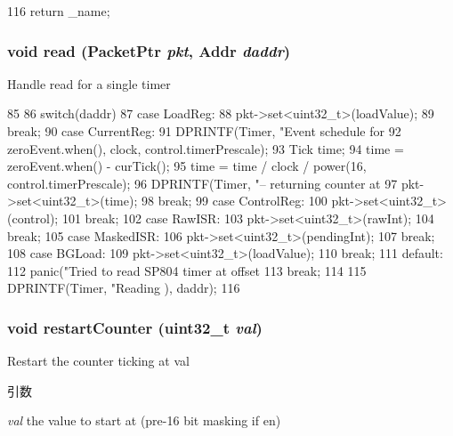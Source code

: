 \begin{DoxyCode}
116 { return _name; }
\end{DoxyCode}
\hypertarget{classSp804_1_1Timer_a6ecbcc960e1c0cd0a0f4c64e7ae58d14}{
\subsubsection[{read}]{\setlength{\rightskip}{0pt plus 5cm}void read ({\bf PacketPtr} {\em pkt}, \/  {\bf Addr} {\em daddr})}}
\label{classSp804_1_1Timer_a6ecbcc960e1c0cd0a0f4c64e7ae58d14}
Handle read for a single timer 


\begin{DoxyCode}
85 {
86     switch(daddr) {
87       case LoadReg:
88         pkt->set<uint32_t>(loadValue);
89         break;
90       case CurrentReg:
91         DPRINTF(Timer, "Event schedule for %
92                 zeroEvent.when(), clock, control.timerPrescale);
93         Tick time;
94         time = zeroEvent.when() - curTick();
95         time = time / clock / power(16, control.timerPrescale);
96         DPRINTF(Timer, "-- returning counter at %
97         pkt->set<uint32_t>(time);
98         break;
99       case ControlReg:
100         pkt->set<uint32_t>(control);
101         break;
102       case RawISR:
103         pkt->set<uint32_t>(rawInt);
104         break;
105       case MaskedISR:
106         pkt->set<uint32_t>(pendingInt);
107         break;
108       case BGLoad:
109         pkt->set<uint32_t>(loadValue);
110         break;
111       default:
112         panic("Tried to read SP804 timer at offset %
113         break;
114     }
115     DPRINTF(Timer, "Reading %
      ), daddr);
116 }
\end{DoxyCode}
\hypertarget{classSp804_1_1Timer_a5e2d72e72192a57c6d3f61a22d1790cc}{
\subsubsection[{restartCounter}]{\setlength{\rightskip}{0pt plus 5cm}void restartCounter ({\bf uint32\_\-t} {\em val})}}
\label{classSp804_1_1Timer_a5e2d72e72192a57c6d3f61a22d1790cc}
Restart the counter ticking at val 
\begin{DoxyParams}{引数}
\item[{\em val}]the value to start at (pre-\/16 bit masking if en) \end{DoxyParams}



